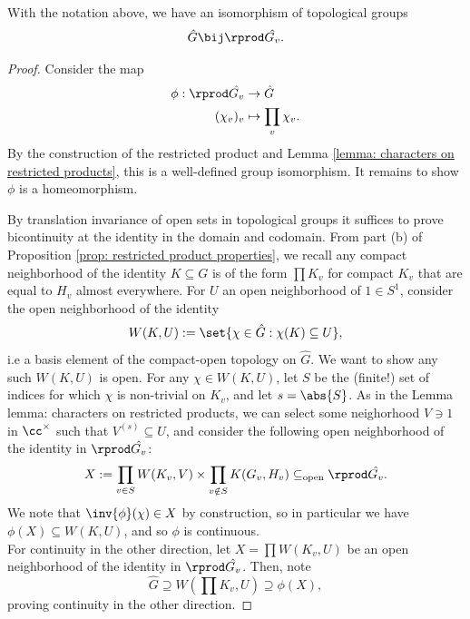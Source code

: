 \documentclass[11pt, x11names, openany]{book}
\begin{document}
\begin{theorem}
    \label{thm: resprod commutes with dual grps}
    With the notation above, we have an isomorphism of topological groups
    \begin{equation*}
        \hat{G} \bij \rprod \hat{G_v}.
    \end{equation*}
\end{theorem}
\begin{proof}
Consider the map 
\begin{align*}
    \phi: \rprod \hat{G_v} & \to \hat{G}\\
(\chi_v)_v &\mapsto \prod_v \chi_v .
\end{align*}
By the construction of the restricted product and Lemma \ref{lemma: characters on restricted products}, this is a well-defined group isomorphism. It remains to show $\phi$ is a homeomorphism.

By translation invariance of open sets in topological groups it suffices to prove bicontinuity at the identity in the domain and codomain. From part (b) of Proposition \ref{prop: restricted product properties}, we recall any compact neighborhood of the identity $K \subseteq G$ is of the form $\prod K_v$ for compact $K_v$ that are equal to $H_v$ almost everywhere. For $U$ an open neighborhood of $1 \in S^1$, consider the open neighborhood of the identity
\begin{equation*}
    W(K, U) := \set{\chi \in \hat{G} : \chi(K) \subseteq U},
\end{equation*}
i.e a basis element of the compact-open topology on $\hat{G}$. We want to show any such $W(K, U)$ is open. For any $\chi \in W(K, U)$, let $S$ be the (finite!) set of indices for which $\chi$ is non-trivial on $K_v$, and let $s = \abs{S}$. As in the Lemma {lemma: characters on restricted products}, we can select some neighorhood $V \ni 1$ in $\cc^\times$ such that $V^{(s)} \subseteq U$, and consider the following open neighborhood of the identity in $\rprod \hat{G_v}$:
\begin{equation*}
    X := \prod_{v \in S} W(K_v, V) \times \prod_{v \notin S} K(G_v, H_v) \subseteq_{\text{open}} \rprod \hat{G_v}.
\end{equation*}
We note that $\inv{\phi}(\chi) \in X$ by construction, so in particular we have $\phi(X) \subseteq W(K, U)$, and so $\phi$ is continuous.\\
For continuity in the other direction, let $X = \prod W(K_v, U)$ be an open neighborhood of the identity in $\rprod \hat{G_v}$. Then, note
\begin{equation*}
    \hat{G} \supseteq W(\prod K_v, U) \supseteq \phi(X),
\end{equation*}
proving continuity in the other direction.
\end{proof}
\end{document}
